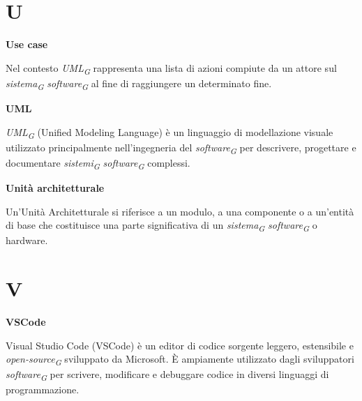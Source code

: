 \documentclass{article}
\begin{document}
\pagebreak
\section*{U}
{}

\vspace{0.4cm}

\textbf{Use case}

\vspace{0.1cm}

Nel contesto \textit{UML}\textsubscript{\textit{G}} rappresenta una lista di azioni compiute da un attore sul \textit{sistema}\textsubscript{\textit{G}} \textit{software}\textsubscript{\textit{G}} al fine di raggiungere un determinato fine.

\vspace{0.4cm}

\textbf{UML}

\vspace{0.1cm}

\textit{UML}\textsubscript{\textit{G}} (Unified Modeling Language) è un linguaggio di modellazione visuale utilizzato principalmente nell'ingegneria del \textit{software}\textsubscript{\textit{G}} per descrivere, progettare e documentare \textit{sistemi}\textsubscript{\textit{G}} \textit{software}\textsubscript{\textit{G}} complessi.

\vspace{0.4cm}

\textbf{Unità architetturale}

\vspace{0.1cm}

Un'Unità Architetturale si riferisce a un modulo, a una componente o a un'entità di base che costituisce una parte significativa di un \textit{sistema}\textsubscript{\textit{G}} \textit{software}\textsubscript{\textit{G}} o hardware. 

\pagebreak
\section*{V}
{}

\vspace{0.4cm}

\textbf{VSCode}

\vspace{0.1cm}

Visual Studio Code (VSCode) è un editor di codice sorgente leggero, estensibile e \textit{open-source}\textsubscript{\textit{G}} sviluppato da Microsoft. È ampiamente utilizzato dagli sviluppatori \textit{software}\textsubscript{\textit{G}} per scrivere, modificare e debuggare codice in diversi linguaggi di programmazione.
\end{document}

